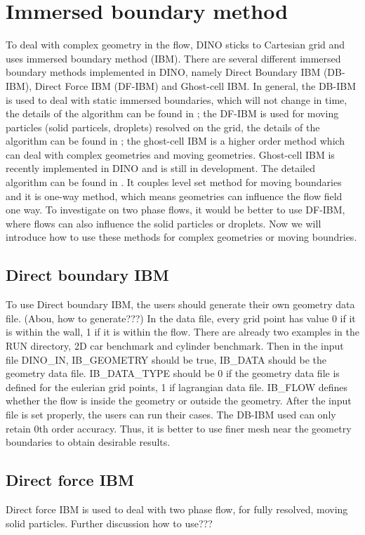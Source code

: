 \section{Immersed boundary method}
\label{ibm}
To deal with complex geometry in the flow, DINO sticks to Cartesian grid and uses immersed boundary method (IBM). There are several different immersed boundary methods implemented in DINO, namely Direct Boundary IBM (DB-IBM), Direct Force IBM (DF-IBM) and Ghost-cell IBM.
In general, the DB-IBM is used to deal with static immersed boundaries, which will not change in time, the details of the algorithm can be found in \cite{fadlun2000, mittal2005}; the DF-IBM is used for moving particles (solid particels, droplets) resolved on the grid, the details of the algorithm can be found in \cite{lucci2010, Uhlmann2005}; the ghost-cell IBM is a higher order method which can deal with complex geometries and moving geometries.
Ghost-cell IBM is recently implemented in DINO and is still in development. The detailed algorithm can be found in \cite{Mittal2008, Chi2016}. It couples level set method for moving boundaries and it is one-way method, which means geometries can influence the flow field one way. To investigate on two phase flows, it would be better to use DF-IBM, where flows can also influence the solid particles or droplets.
Now we will introduce how to use these methods for complex geometries or moving boundries.
\subsection{Direct boundary IBM}
To use Direct boundary IBM, the users should generate their own geometry data file. (Abou, how to generate???) In the data file, every grid point has value 0 if it is within the wall, 1 if it is within the flow. There are already two examples in the RUN directory, 2D car benchmark and cylinder benchmark. Then in the input file DINO\_IN, IB\_GEOMETRY should be true, IB\_DATA should be the geometry data file. IB\_DATA\_TYPE should be 0 if the geometry data file is defined for the eulerian grid points, 1 if lagrangian data file. IB\_FLOW defines whether the flow is inside the geometry or outside the geometry.
After the input file is set properly, the users can run their cases. The DB-IBM used can only retain 0th order accuracy. Thus, it is better to use finer mesh near the geometry boundaries to obtain desirable results.
\subsection{Direct force IBM}
Direct force IBM is used to deal with two phase flow, for fully resolved, moving solid particles. Further discussion how to use???

